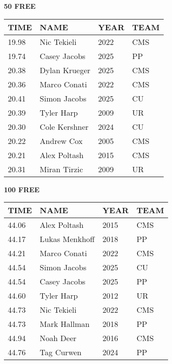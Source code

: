 \begin{table}[H]
\centering
\begin{minipage}[t]{0.48\textwidth}
\centering
\textbf{50 FREE}\\[0.1cm]
\begin{tabular}{@{}p{1.8cm}p{2.8cm}p{1.2cm}p{1.4cm}@{}}
\hline
    \textbf{TIME} & \textbf{NAME} & \textbf{YEAR} & \textbf{TEAM} \\
\hline
    19.98 & Nic Tekieli & 2022 & CMS \\
    19.74 & Casey Jacobs & 2025 & PP \\
    20.38 & Dylan Krueger & 2025 & CMS \\
    20.36 & Marco Conati & 2022 & CMS \\
    20.41 & Simon Jacobs & 2025 & CU \\
    20.39 & Tyler Harp & 2009 & UR \\
    20.30 & Cole Kershner & 2024 & CU \\
    20.22 & Andrew Cox & 2005 & CMS \\
    20.21 & Alex Poltash & 2015 & CMS \\
    20.31 & Miran Tirzic & 2009 & UR \\
\hline
\end{tabular}
\end{minipage}\hfill
\begin{minipage}[t]{0.48\textwidth}
\centering
\textbf{100 FREE}\\[0.1cm]
\begin{tabular}{@{}p{1.8cm}p{2.8cm}p{1.2cm}p{1.4cm}@{}}
\hline
    \textbf{TIME} & \textbf{NAME} & \textbf{YEAR} & \textbf{TEAM} \\
\hline
    44.06 & Alex Poltash & 2015 & CMS \\
    44.17 & Lukas Menkhoff & 2018 & PP \\
    44.21 & Marco Conati & 2022 & CMS \\
    44.54 & Simon Jacobs & 2025 & CU \\
    44.54 & Casey Jacobs & 2025 & PP \\
    44.60 & Tyler Harp & 2012 & UR \\
    44.73 & Nic Tekieli & 2022 & CMS \\
    44.73 & Mark Hallman & 2018 & PP \\
    44.94 & Noah Deer & 2016 & CMS \\
    44.76 & Tag Curwen & 2024 & PP \\
\hline
\end{tabular}
\end{minipage}
\end{table}

